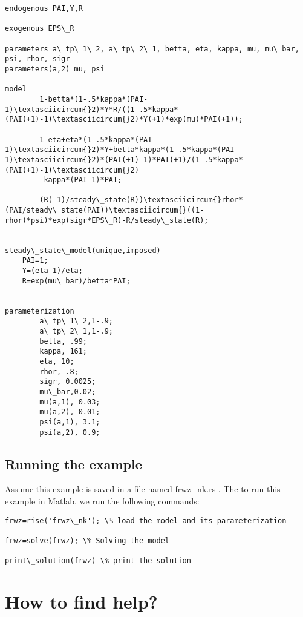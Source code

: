 \documentclass[letterpaper,10pt,english]{sphinxmanual}
\begin{document}
\begin{Verbatim}[commandchars=\\\{\}]
endogenous PAI,Y,R

exogenous EPS\_R

parameters a\_tp\_1\_2, a\_tp\_2\_1, betta, eta, kappa, mu, mu\_bar, psi, rhor, sigr
parameters(a,2) mu, psi

model
        1-betta*(1-.5*kappa*(PAI-1)\textasciicircum{}2)*Y*R/((1-.5*kappa*(PAI(+1)-1)\textasciicircum{}2)*Y(+1)*exp(mu)*PAI(+1));

        1-eta+eta*(1-.5*kappa*(PAI-1)\textasciicircum{}2)*Y+betta*kappa*(1-.5*kappa*(PAI-1)\textasciicircum{}2)*(PAI(+1)-1)*PAI(+1)/(1-.5*kappa*(PAI(+1)-1)\textasciicircum{}2)
        -kappa*(PAI-1)*PAI;

        (R(-1)/steady\_state(R))\textasciicircum{}rhor*(PAI/steady\_state(PAI))\textasciicircum{}((1-rhor)*psi)*exp(sigr*EPS\_R)-R/steady\_state(R);


steady\_state\_model(unique,imposed)
    PAI=1;
    Y=(eta-1)/eta;
    R=exp(mu\_bar)/betta*PAI;


parameterization
        a\_tp\_1\_2,1-.9;
        a\_tp\_2\_1,1-.9;
        betta, .99;
        kappa, 161;
        eta, 10;
        rhor, .8;
        sigr, 0.0025;
        mu\_bar,0.02;
        mu(a,1), 0.03;
        mu(a,2), 0.01;
        psi(a,1), 3.1;
        psi(a,2), 0.9;
\end{Verbatim}


\subsection{Running the example}
\label{getting_started_folder/tutorial:running-the-example}
Assume this example is saved in a file named frwz\_nk.rs . The to run this example in Matlab, we run the following commands:

\begin{Verbatim}[commandchars=\\\{\}]
frwz=rise('frwz\_nk'); \% load the model and its parameterization

frwz=solve(frwz); \% Solving the model

print\_solution(frwz) \% print the solution
\end{Verbatim}


\section{How to find help?}
\label{getting_started_folder/howto_find_doc:how-to-find-help}\label{getting_started_folder/howto_find_doc::doc}
\end{document}
